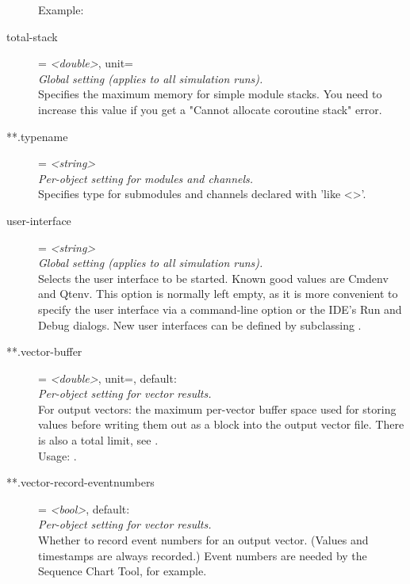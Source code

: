 \begin{description}
    Example:
\item[total-stack] = \textit{<double>}, unit=\\
    \textit{Global setting (applies to all simulation runs).}\\
    Specifies the maximum memory for  simple module stacks. You
    need to increase this value if you get a "Cannot allocate coroutine stack"
    error.
\item[**.typename] = \textit{<string>}\\
    \textit{Per-object setting for modules and channels.}\\
    Specifies type for submodules and channels declared with 'like <>'.
\item[user-interface] = \textit{<string>}\\
    \textit{Global setting (applies to all simulation runs).}\\
    Selects the user interface to be started. Known good values are Cmdenv and
    Qtenv. This option is normally left empty, as it is more convenient to
    specify the user interface via a command-line option or the IDE's Run and
    Debug dialogs. New user interfaces can be defined by subclassing
    .
\item[**.vector-buffer] = \textit{<double>}, unit=, default: \\
    \textit{Per-object setting for vector results.}\\
    For output vectors: the maximum per-vector buffer space used for storing
    values before writing them out as a block into the output vector file.
    There is also a total limit, see
    .\\
    Usage:
    .
\item[**.vector-record-eventnumbers] = \textit{<bool>}, default: \\
    \textit{Per-object setting for vector results.}\\
    Whether to record event numbers for an output vector. (Values and
    timestamps are always recorded.) Event numbers are needed by the Sequence
    Chart Tool, for example.\\

\end{description}
